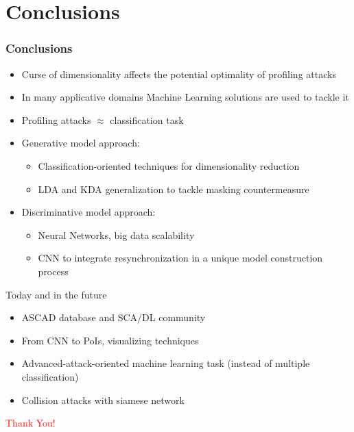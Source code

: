 
\section{Conclusions}

\begin{frame}
\frametitle{Conclusions}
\begin{itemize}
\item Curse of dimensionality affects the potential optimality of profiling attacks
\item In many applicative domains Machine Learning solutions are used to tackle it
\item Profiling attacks $\approx$ classification task
\item Generative model approach:
\begin{itemize}
\item Classification-oriented techniques for dimensionality reduction 
\item LDA and KDA generalization to tackle masking countermeasure
\end{itemize}
\item Discriminative model approach:
\begin{itemize}
\item Neural Networks, big data scalability
\item CNN to integrate resynchronization in a unique model construction process
\end{itemize}
\end{itemize}
\pause
\begin{block}{Today and in the future}
\begin{itemize}
\item ASCAD database and SCA/DL community
\item From CNN to PoIs, visualizing techniques
\item Advanced-attack-oriented machine learning task (instead of multiple classification)
\item Collision attacks with siamese network
\end{itemize}
\end{block}
\pause
\vspace{30pt}
\begin{huge}
\textcolor{red}{\hfill Thank You!}
\end{huge}

\end{frame}

